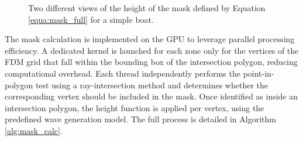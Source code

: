 \documentclass[final]{jcgt}
\begin{document}
\begin{figure}[htbp]
	\centering
	\hspace{1cm}
	\caption{Two different views of the height of the mask defined by Equation \ref{equa:mask_full} for a simple boat.}
	\label{fig:mask}
\end{figure}

The mask calculation is implemented on the GPU to leverage parallel processing efficiency. A dedicated kernel is launched for each zone only for the vertices of the FDM grid that fall within the bounding box of the intersection polygon, reducing computational overhead. Each thread independently performs the point-in-polygon test using a ray-intersection method and determines whether the corresponding vertex should be included in the mask. Once identified as inside an intersection polygon, the height function is applied per vertex, using the predefined wave generation model. The full process is detailed in Algorithm \ref{alg:mask_calc}.
\end{document}
